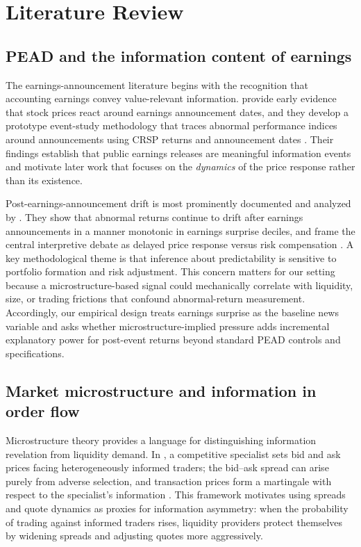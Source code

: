 \section{Literature Review}

\subsection{PEAD and the information content of earnings}
The earnings-announcement literature begins with the recognition that accounting earnings convey
value-relevant information. \citet{BallBrown1968} provide early evidence that stock prices react around
earnings announcement dates, and they develop a prototype event-study methodology that traces abnormal
performance indices around announcements using CRSP returns and announcement dates \citep{BallBrown1968}.
Their findings establish that public earnings releases are meaningful information events and motivate
later work that focuses on the \emph{dynamics} of the price response rather than its existence.

Post-earnings-announcement drift is most prominently documented and analyzed by \citet{BernardThomas1989}.
They show that abnormal returns continue to drift after earnings announcements in a manner monotonic
in earnings surprise deciles, and frame the central interpretive debate as delayed price response versus
risk compensation \citep{BernardThomas1989}. A key methodological theme is that inference about
predictability is sensitive to portfolio formation and risk adjustment. This concern matters for our
setting because a microstructure-based signal could mechanically correlate with liquidity, size, or
trading frictions that confound abnormal-return measurement. Accordingly, our empirical design treats
earnings surprise as the baseline news variable and asks whether microstructure-implied pressure adds
incremental explanatory power for post-event returns beyond standard PEAD controls and specifications.

\subsection{Market microstructure and information in order flow}
Microstructure theory provides a language for distinguishing information revelation from liquidity demand.
In \citet{GlostenMilgrom1985}, a competitive specialist sets bid and ask prices facing heterogeneously
informed traders; the bid--ask spread can arise purely from adverse selection, and transaction prices
form a martingale with respect to the specialist's information \citep{GlostenMilgrom1985}. This framework
motivates using spreads and quote dynamics as proxies for information asymmetry: when the probability of
trading against informed traders rises, liquidity providers protect themselves by widening spreads and
adjusting quotes more aggressively.

